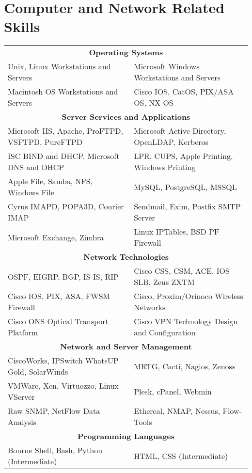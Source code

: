 \section*{Computer and Network Related Skills}
\begin{center}
\begin{tabular}{l l}
\multicolumn{2}{c}{\bf Operating Systems}\\
Unix, Linux Workstations and Servers & Microsoft Windows Workstations and Servers\\
Macintosh OS Workstations and Servers & Cisco IOS, CatOS, PIX/ASA OS, NX OS\\
\multicolumn{2}{c}{\bf Server Services and Applications}\\
Microsoft IIS, Apache, ProFTPD, VSFTPD, PureFTPD & Microsoft Active Directory, OpenLDAP, Kerberos\\
ISC BIND and DHCP, Microsoft DNS and DHCP & LPR, CUPS, Apple Printing, Windows Printing\\
Apple File, Samba, NFS, Windows File & MySQL, PostgreSQL, MSSQL\\
Cyrus IMAPD, POPA3D, Courier IMAP & Sendmail, Exim, Postfix SMTP Server\\
Microsoft Exchange, Zimbra & Linux IPTables, BSD PF Firewall\\
\multicolumn{2}{c}{\bf Network Technologies}\\
OSPF, EIGRP, BGP, IS-IS, RIP & Cisco CSS, CSM, ACE, IOS SLB, Zeus ZXTM\\
Cisco IOS, PIX, ASA, FWSM Firewall & Cisco, Proxim/Orinoco Wireless Networks\\
Cisco ONS Optical Transport Platform & Cisco VPN Technology Design and Configuration\\
\multicolumn{2}{c}{\bf Network and Server Management}\\
CiscoWorks, IPSwitch WhatsUP Gold, SolarWinds & MRTG, Cacti, Nagios, Zenoss\\
VMWare, Xen, Virtuozzo, Linux VServer & Plesk, cPanel, Webmin\\
Raw SNMP, NetFlow Data Analysis & Ethereal, NMAP, Nessus, Flow-Tools\\
\multicolumn{2}{c}{\bf Programming Languages}\\
Bourne Shell, Bash, Python (Intermediate) & HTML, CSS (Intermediate)\\
\end{tabular}
\end{center}
